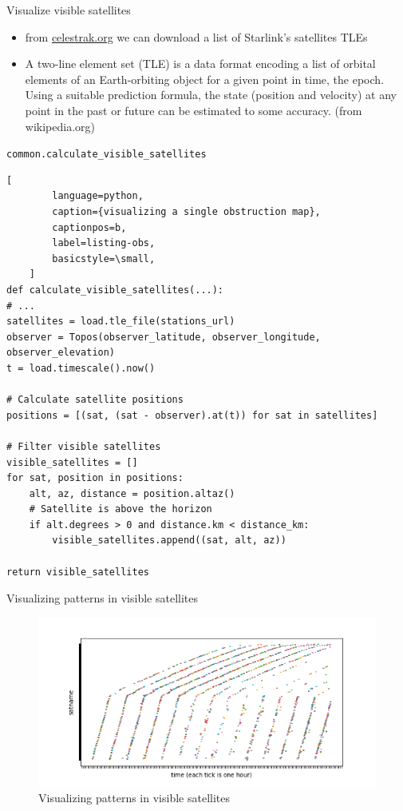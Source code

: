 \documentclass[NET,english,beameralt]{tumbeamer}
\begin{document}
\begin{frame}{Visualize visible satellites}
\begin{itemize}
    \item from \href{celestrak.org}{celestrak.org} we can download a list of Starlink's satellites TLEs
    \item A two-line element set (TLE) is a data format encoding a list of orbital elements of an Earth-orbiting object
    for a given point in time, the epoch. Using a suitable prediction formula, the state (position and velocity) at any
    point in the past or future can be estimated to some accuracy. (from wikipedia.org)
\end{itemize}
\end{frame}

\begin{frame}[fragile]{\texttt{common.calculate\_visible\_satellites}}
    \begin{lstlisting}[
        language=python,
        caption={visualizing a single obstruction map},
        captionpos=b,
        label=listing-obs,
        basicstyle=\small,
    ]
def calculate_visible_satellites(...):
# ...
satellites = load.tle_file(stations_url)
observer = Topos(observer_latitude, observer_longitude, observer_elevation)
t = load.timescale().now()

# Calculate satellite positions
positions = [(sat, (sat - observer).at(t)) for sat in satellites]

# Filter visible satellites
visible_satellites = []
for sat, position in positions:
    alt, az, distance = position.altaz()
    # Satellite is above the horizon
    if alt.degrees > 0 and distance.km < distance_km:
        visible_satellites.append((sat, alt, az))

return visible_satellites
    \end{lstlisting}
\end{frame}

\begin{frame}{Visualizing patterns in visible satellites}
    \begin{figure}
        \includegraphics[width=1\textwidth]{pics/visualizing-how-long-satellites-are-visible-for.png}
        \caption[short]{Visualizing patterns in visible satellites}
    \end{figure}
\end{frame}
\end{document}
